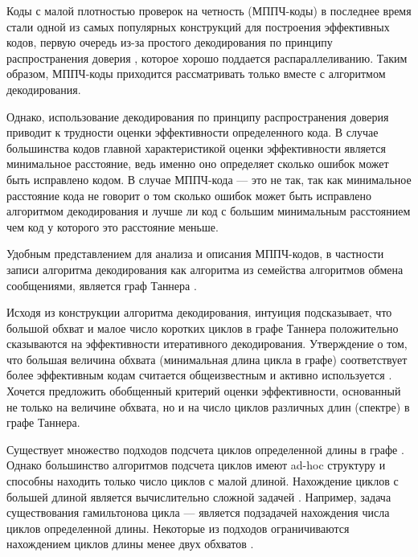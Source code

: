 \startprefacepage

Коды с малой плотностью проверок на четность (МППЧ-коды) в последнее время стали одной из
самых популярных конструкций для построения эффективных кодов, первую очередь из-за 
простого декодирования по принципу распространения доверия \cite{understanding-belief-propogation}, которое
хорошо поддается распараллеливанию. Таким образом, МППЧ-коды приходится рассматривать только вместе с
алгоритмом декодирования.

Однако, использование декодирования по принципу распространения доверия приводит к трудности оценки
эффективности определенного кода. В случае большинства кодов главной характеристикой оценки эффективности
является минимальное расстояние, ведь именно оно определяет сколько ошибок может быть исправлено кодом.
В случае МППЧ-кода --- это не так, так как минимальное расстояние кода не говорит о том сколько ошибок может быть исправлено алгоритмом декодирования и лучше ли код с большим минимальным расстоянием
чем код у которого это расстояние меньше.

Удобным представлением для анализа и описания МППЧ-кодов, в частности записи алгоритма декодирования
как алгоритма из семейства алгоритмов обмена сообщениями, является граф Таннера \cite{kudryashov-codingtheory}.

Исходя из конструкции алгоритма декодирования, интуиция подсказывает, что большой обхват и 
малое число коротких циклов в графе Таннера положительно сказываются на эффективности 
итеративного декодирования. Утверждение о том, что большая величина обхвата 
(минимальная длина цикла в графе) соответствует более эффективным кодам считается общеизвестным и активно используется \cite{kudryashov-codingtheory}. Хочется предложить обобщенный критерий оценки
эффективности, основанный не только на величине обхвата, но и на число циклов различных длин (спектре)
в графе Таннера.

Существует множество подходов подсчета циклов определенной длины в графе
\cite{finding-and-counting-given-length-cycles,on-the-number-of-cycles-in-a-graph}.
Однако большинство алгоритмов подсчета циклов имеют ad-hoc структуру и способны находить 
только число циклов
с малой длиной. Нахождение циклов с большей длиной является вычислительно сложной задачей
\cite{how-to-find-long-paths-efficiently,color-coding}. 
Например, задача существования гамильтонова цикла --- является подзадачей нахождения числа циклов
определенной длины. Некоторые из подходов ограничиваются нахождением циклов длины менее двух обхватов 
\cite{message-passing-algorithm-for-counting-short-cycles-in-graph,counting-short-cycles-of-quasi-cyclic-protograph-ldpc-codes}.

